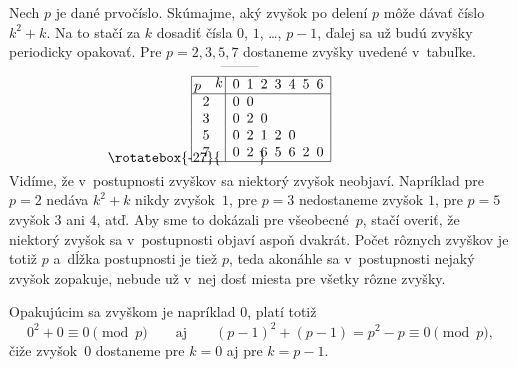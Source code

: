 {%
Nech $p$ je dané prvočíslo. Skúmajme, aký zvyšok po delení $p$ môže dávať číslo $k^2+k$. Na to stačí za $k$ dosadiť čísla $0$, $1$, \dots, $p-1$, ďalej sa už budú zvyšky periodicky opakovať. Pre $p=2,3,5,7$ dostaneme zvyšky uvedené v~tabuľke.

\def\clap#1{\hbox to 0pt{\hss#1\hss}}
\def\sikma{\smash{\clap{\kern-2.3mm\rotatebox{-27}{\rule[24mm]{0.95cm}{.4pt}}}}}
$$
\sikma
\vbox{\offinterlineskip \let\\=\cr
\def\ab{\raise\ht\strutbox\hbox{}%
        \,\lower1pt\hbox{$p$}\quad
        \raise.2ex\hbox{$k$}\,\lower\dp\strutbox\hbox{}}%
\halign{\vrule\strut\hss#\hfil\vrule
        &\enspace\hss$#$\enspace&\hss$#$\enspace&\hss$#$\enspace&\hss$#$\enspace&\hss$#$\enspace&\hss$#$\enspace&\hss$#$\enspace\vrule\\
\noalign{\hrule}
\ab &0 &1 &2 &3 &4 &5 &6\\
\noalign{\hrule}
 2  &0 &0 & & & & &\\
 3  &0 &2 &0 & & & &\\
 5  &0 &2 &1 &2 &0 & &\\
 7  &0 &2 &6 &5 &6 &2 &0\cr
\noalign{\hrule}
}}%
$$
Vidíme, že v~postupnosti zvyškov sa niektorý zvyšok neobjaví. Napríklad pre $p=2$ nedáva $k^2+k$ nikdy zvyšok~$1$, pre $p=3$ nedostaneme zvyšok $1$, pre $p=5$ zvyšok $3$ ani $4$, atď. Aby sme to dokázali pre všeobecné~$p$, stačí overiť, že niektorý zvyšok sa v~postupnosti objaví aspoň dvakrát. Počet rôznych zvyškov je totiž $p$ a~dĺžka postupnosti je tiež $p$, teda akonáhle sa v~postupnosti nejaký zvyšok zopakuje, nebude už v~nej dosť miesta pre všetky rôzne zvyšky.

Opakujúcim sa zvyškom je napríklad $0$, platí totiž
$$
0^2+0\equiv0\pmod p \qquad\text{aj}\qquad (p-1)^2+(p-1)=p^2-p\equiv0\pmod p,
$$
čiže zvyšok~$0$ dostaneme pre $k=0$ aj pre $k=p-1$.

}
